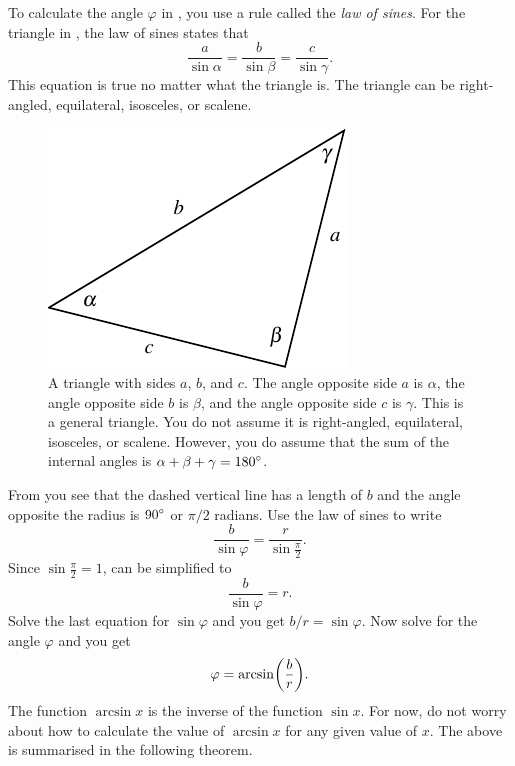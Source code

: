 \documentclass[a4paper,oneside,12pt]{article}
\begin{document}
To calculate the angle $\varphi$ in
, you use a
rule called the \emph{law of sines}.  For the triangle in
, the law of sines states that
\[
\frac{a}{\sin\alpha}
=
\frac{b}{\sin\beta}
=
\frac{c}{\sin\gamma}.
\]
This equation is true no matter what the triangle is.  The triangle
can be right-angled, equilateral, isosceles, or scalene.

\begin{figure}[!htbp]
\centering
\includegraphics[scale=1.1]{image/04/law-sines.pdf}
\caption{%
  A triangle with sides $a$, $b$, and $c$.  The angle opposite side
  $a$ is $\alpha$, the angle opposite side $b$ is $\beta$, and the
  angle opposite side $c$ is $\gamma$.  This is a general triangle.
  You do not assume it is right-angled, equilateral, isosceles, or
  scalene.  However, you do assume that the sum of the internal angles
  is $\alpha + \beta + \gamma = {180}^{\circ}$.
}
\label{fig:law_of_sines}
\end{figure}

From
 you see that
the dashed vertical line has a length of $b$ and the angle opposite
the radius is ${90}^{\circ}$ or $\pi / 2$ radians.  Use the law of
sines to write
\begin{equation}
\label{eqn:law_of_sines}
\frac{b}{\sin \varphi}
=
\frac{r}{\sin \frac{\pi}{2}}.
\end{equation}
Since $\sin \frac{\pi}{2} = 1$,  can be
simplified to
\[
\frac{b}{\sin \varphi}
=
r.
\]
Solve the last equation for $\sin \varphi$ and you get
$b/r = \sin \varphi$.  Now solve for the angle $\varphi$ and you get
\[
\varphi
=
\arcsin\parenthesis*{\frac{b}{r}}.
\]
The function $\arcsin x$ is the inverse of the function $\sin x$.  For
now, do not worry about how to calculate the value of $\arcsin x$ for
any given value of $x$.  The above is summarised in the following
theorem.
\end{document}
